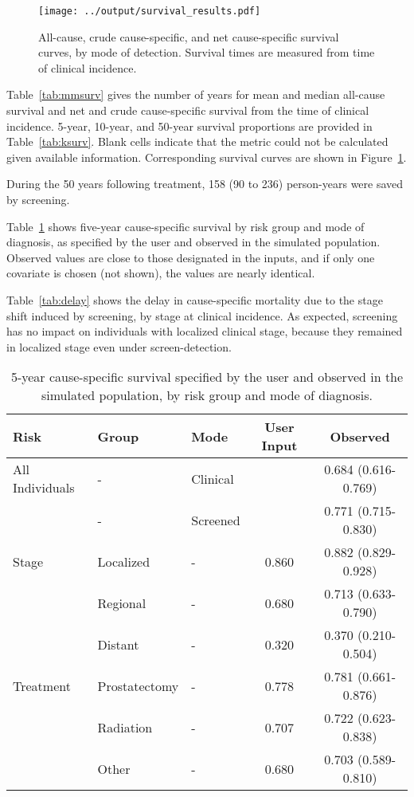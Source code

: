 \documentclass[11pt]{article}
\begin{document}
\begin{figure}[!ht]
    \centering
    \texttt{[image: ../output/survival\_results.pdf]}
    \caption{All-cause, crude cause-specific, and net cause-specific survival curves, by mode of detection. Survival times are measured from time of clinical incidence.}
    \label{fig:surv}
\end{figure}
	
Table~\ref{tab:mmsurv} gives the number of years for mean and median all-cause survival and net and crude cause-specific survival from the time of clinical incidence. 5-year, 10-year, and 50-year survival proportions are provided in Table~\ref{tab:ksurv}.
Blank cells indicate that the metric could not be calculated given available information.
Corresponding survival curves are shown in Figure~\ref{fig:surv}. 

During the 50 years following treatment, 158 (90 to 236) person-years were saved by screening.

Table~\ref{tab:csm} shows five-year cause-specific survival by risk group and mode of diagnosis, as specified by the user and observed in the simulated population. Observed values are close to those designated in the inputs, and if only one covariate is chosen (not shown), the values are nearly identical.

Table~\ref{tab:delay} shows the delay in cause-specific mortality due to the stage shift induced by screening, by stage at clinical incidence. As expected, screening has no impact on individuals with localized clinical stage, because they remained in localized stage even under screen-detection.


\begin{table}[!ht]
\centering
\begin{tabular}{lllcc}
  \hline
Risk & Group & Mode & User Input & Observed \\ 
  \hline
All Individuals & - & Clinical &  & 0.684 (0.616-0.769) \\ 
   & - & Screened &  & 0.771 (0.715-0.830) \\ 
  Stage & Localized & - & 0.860 & 0.882 (0.829-0.928) \\ 
   & Regional & - & 0.680 & 0.713 (0.633-0.790) \\ 
   & Distant & - & 0.320 & 0.370 (0.210-0.504) \\ 
  Treatment & Prostatectomy & - & 0.778 & 0.781 (0.661-0.876) \\ 
   & Radiation & - & 0.707 & 0.722 (0.623-0.838) \\ 
   & Other & - & 0.680 & 0.703 (0.589-0.810) \\ 
   \hline
\end{tabular}
\caption{5-year cause-specific survival specified by the user and observed in the simulated population, by risk group and mode of diagnosis.} 
\label{tab:csm}
\end{table}
\end{document}
